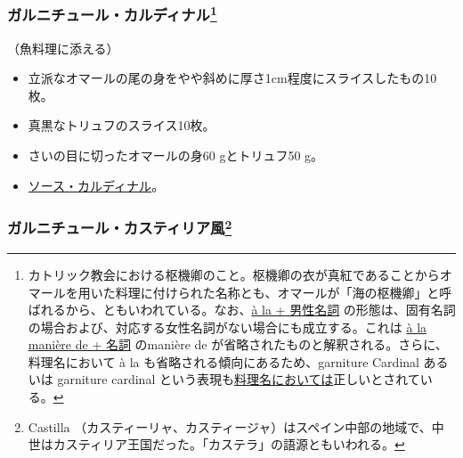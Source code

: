\begin{recette}
\atoaki{}

\hypertarget{garniture-cardinal}{%
\subsubsection[ガルニチュール・カルディナル]{\texorpdfstring{ガルニチュール・カルディナル\footnote{カトリック教会における枢機卿のこと。枢機卿の衣が真紅であることからオマールを用いた料理に付けられた名称とも、オマールが「海の枢機卿」と呼ばれるから、ともいわれている。なお、\ul{à la + 男性名詞}
  の形態は、固有名詞の場合および、対応する女性名詞がない場合にも成立する。これは
  \ul{à la manière de + 名詞} のmanière de
  が省略されたものと解釈される。さらに、料理名において à la
  も省略される傾向にあるため、garniture Cardinal あるいは garniture
  cardinal という表現も\ul{料理名においては}正しいとされている。}}{ガルニチュール・カルディナル}}\label{garniture-cardinal}}



（魚料理に添える）

\begin{itemize}
\item
  立派なオマールの尾の身をやや斜めに厚さ1cm程度にスライスしたもの10枚。
\item
  真黒なトリュフのスライス10枚。
\item
  さいの目に切ったオマールの身60 gとトリュフ50 g。
\item
  \protect\hyperlink{sauce-cardinal}{ソース・カルディナル}。
\end{itemize}

\atoaki{}

\hypertarget{garniture-castillane}{%
\subsubsection[ガルニチュール・カスティリア風]{\texorpdfstring{ガルニチュール・カスティリア風\footnote{Castilla
  （カスティーリャ、カスティージャ）はスペイン中部の地域で、中世はカスティリア王国だった。「カステラ」の語源ともいわれる。}}{ガルニチュール・カスティリア風}}\label{garniture-castillane}}


\end{recette}
